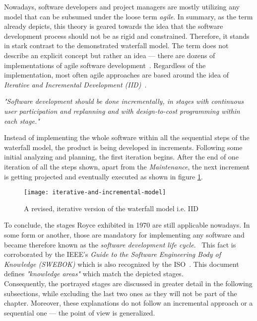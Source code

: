 \documentclass[12pt,a4paper]{report}
\begin{document}
Nowadays, software developers and project managers are mostly utilizing any model that
can be subsumed under the loose term \textit{agile}.
In summary, as the term already depicts, this theory is geared towards
the idea that the software development process should not be as rigid and constrained.
Therefore, it stands in stark contrast to the demonstrated waterfall model.
The term does not describe an explicit concept but rather an idea ---
there are dozens of implementations of agile software development~\cite{martin-agile-practices}.
Regardless of the implementation, most often agile approaches are based around
the idea of \textit{Iterative and Incremental Development (IID)}~\cite{larman-iid-history}.
\begin{displayquote}
\emph{"Software development should be done incrementally, in stages with
continuous user participation and replanning and
with design-to-cost programming within each stage."}~\cite{mills-iid}
\end{displayquote}
Instead of implementing the whole software within all the sequential steps
of the waterfall model, the product is being developed in increments.
Following some initial analyzing and planning, the first iteration begins.
After the end of one iteration of all the steps shown, apart from the \textit{Maintenance},
the next increment is getting projected and eventually executed as shown in figure \ref{fig:idd-model}.
\begin{figure}[htbp]
\centering
\texttt{[image: iterative-and-incremental-model]}
\caption{A revised, iterative version of the waterfall model i.e. IID}
\label{fig:idd-model}
\end{figure}\newline
To conclude, the stages Royce exhibited in 1970 are still applicable nowadays.
In some form or another, those are mandatory for implementing any software
and became therefore known as the \textit{software development life cycle}.~\cite{se-ieee}
This fact is corroborated by the IEEE's
\textit{Guide to the Software Engineering Body of Knowledge (SWEBOK)}
which is also recognized by the ISO~\cite{swebok}.
This document defines \textit{"knowledge areas"} which match the depicted stages.\\
Consequently, the portrayed stages are discussed in greater detail in the following subsections,
while excluding the last two ones as they will not be part of the
\textit{} chapter.
Moreover, these explanations do not follow an incremental approach
or a sequential one --- the point of view is generalized.
\end{document}
